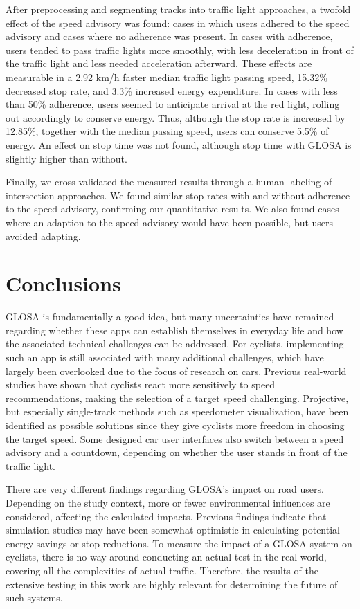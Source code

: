 \begin{Summary}
After preprocessing and segmenting tracks into traffic light approaches, a twofold effect of the speed advisory was found: cases in which users adhered to the speed advisory and cases where no adherence was present. In cases with adherence, users tended to pass traffic lights more smoothly, with less deceleration in front of the traffic light and less needed acceleration afterward. These effects are measurable in a 2.92 km/h faster median traffic light passing speed, 15.32\% decreased stop rate, and 3.3\% increased energy expenditure. In cases with less than 50\% adherence, users seemed to anticipate arrival at the red light, rolling out accordingly to conserve energy. Thus, although the stop rate is increased by 12.85\%, together with the median passing speed, users can conserve 5.5\% of energy. An effect on stop time was not found, although stop time with GLOSA is slightly higher than without.

Finally, we cross-validated the measured results through a human labeling of intersection approaches. We found similar stop rates with and without adherence to the speed advisory, confirming our quantitative results. We also found cases where an adaption to the speed advisory would have been possible, but users avoided adapting.
\end{Summary}

\section{Conclusions}

GLOSA is fundamentally a good idea, but many uncertainties have remained regarding whether these apps can establish themselves in everyday life and how the associated technical challenges can be addressed. For cyclists, implementing such an app is still associated with many additional challenges, which have largely been overlooked due to the focus of research on cars. Previous real-world studies have shown that cyclists react more sensitively to speed recommendations, making the selection of a target speed challenging. Projective, but especially single-track methods such as speedometer visualization, have been identified as possible solutions since they give cyclists more freedom in choosing the target speed. Some designed car user interfaces also switch between a speed advisory and a countdown, depending on whether the user stands in front of the traffic light.

There are very different findings regarding GLOSA's impact on road users. Depending on the study context, more or fewer environmental influences are considered, affecting the calculated impacts. Previous findings indicate that simulation studies may have been somewhat optimistic in calculating potential energy savings or stop reductions. To measure the impact of a GLOSA system on cyclists, there is no way around conducting an actual test in the real world, covering all the complexities of actual traffic. Therefore, the results of the extensive testing in this work are highly relevant for determining the future of such systems.

